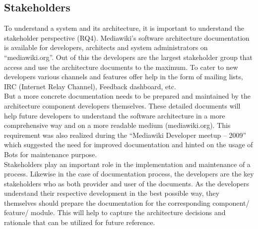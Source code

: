 \subsection{Stakeholders}
\indent To understand a system and its architecture, it is important to understand the stakeholder perspective (RQ4).  Mediawiki's software architecture documentation is available for developers, architects and system administrators on \enquote{mediawiki.org}. Out of this the developers are the largest stakeholder group that access and use the architecture documents to the maximum. To cater to new developers various channels and features offer help in the form of mailing lists, IRC (Internet Relay Channel), Feedback dashboard, etc. 
\\\indent But a more concrete documentation needs to be prepared and maintained by the architecture component developers themselves. These detailed documents will help future developers to understand the software architecture in a more comprehensive way and on a more readable medium (mediawiki.org). This requirement was also realized during the \enquote{Mediawiki Developer meetup – 2009} which suggested the need for improved documentation and hinted on the usage of Bots for maintenance purpose.
\\\indent Stakeholders play an important role in the implementation and maintenance of a process. Likewise in the case of documentation process, the developers are the key stakeholders who as both provider and user of the documents. As the developers understand their respective development in the best possible way, they themselves should prepare the documentation for the corresponding component/ feature/ module. This will help to capture the architecture decisions and rationale that can be utilized for future reference.
